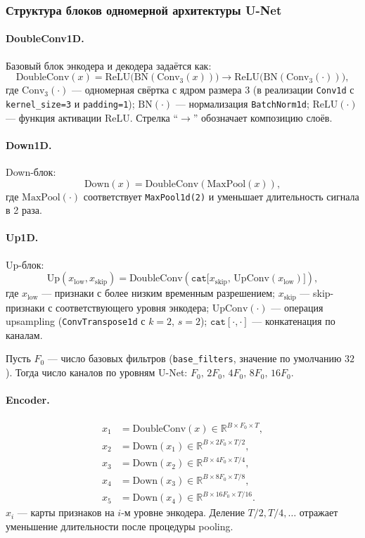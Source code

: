 \documentclass[11pt, oneside, a4paper]{article}
\begin{document}
\subsubsection{Структура блоков одномерной архитектуры U-Net}

\paragraph{DoubleConv1D.}
Базовый блок энкодера и декодера задаётся как:
\[
\text{DoubleConv}(x)=
\text{ReLU}\big(\text{BN}(\text{Conv}_{3}(x))\big)
\rightarrow
\text{ReLU}\big(\text{BN}(\text{Conv}_{3}(\cdot))\big),
\]
где $\text{Conv}_{3}(\cdot)$ --- одномерная свёртка с ядром размера $3$ (в реализации \texttt{Conv1d} с \texttt{kernel\_size=3} и
\texttt{padding=1}); $\text{BN}(\cdot)$ --- нормализация \texttt{BatchNorm1d}; $\text{ReLU}(\cdot)$ --- функция активации ReLU. Стрелка ``$\rightarrow$'' обозначает композицию слоёв.

\paragraph{Down1D.}
Down-блок:
\[
\text{Down}(x) = \text{DoubleConv}(\text{MaxPool}(x)),
\]
где $\text{MaxPool}(\cdot)$ соответствует \texttt{MaxPool1d(2)} и уменьшает длительность сигнала в 2 раза.

\paragraph{Up1D.}
Up-блок:
\[
\text{Up}(x_{\text{low}}, x_{\text{skip}}) =
\text{DoubleConv}\left(\texttt{cat}\big[x_{\text{skip}},\, \text{UpConv}(x_{\text{low}})\big]\right),
\]
где $x_{\text{low}}$ --- признаки с более низким временным разрешением;
$x_{\text{skip}}$ --- skip-признаки с соответствующего уровня энкодера;
$\text{UpConv}(\cdot)$ --- операция upsampling (\texttt{ConvTranspose1d} с $k=2$, $s=2$);
$\texttt{cat}[\cdot,\cdot]$ --- конкатенация по каналам.

Пусть $F_0$ --- число базовых фильтров (\texttt{base\_filters}, значение по умолчанию $32$). Тогда число каналов по уровням U-Net:
$F_0,\,2F_0,\,4F_0,\,8F_0,\,16F_0$.

\paragraph{Encoder.}
\begin{align*}
x_1 &= \text{DoubleConv}(x) \in \mathbb{R}^{B \times F_0 \times T},\\
x_2 &= \text{Down}(x_1) \in \mathbb{R}^{B \times 2F_0 \times T/2},\\
x_3 &= \text{Down}(x_2) \in \mathbb{R}^{B \times 4F_0 \times T/4},\\
x_4 &= \text{Down}(x_3) \in \mathbb{R}^{B \times 8F_0 \times T/8},\\
x_5 &= \text{Down}(x_4) \in \mathbb{R}^{B \times 16F_0 \times T/16}.
\end{align*}
$x_i$ --- карты признаков на $i$-м уровне энкодера. Деление $T/2, T/4, \dots$ отражает уменьшение длительности после процедуры pooling.
\end{document}
